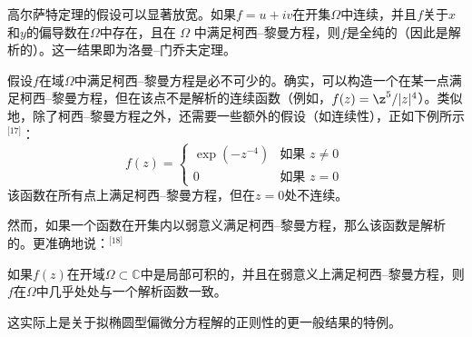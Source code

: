 高尔萨特定理的假设可以显著放宽。如果\( f = u + iv \)在开集\( \Omega \)中连续，并且\( f \)关于\( x \)和\( y \)的偏导数在\( \Omega \)中存在，且在 \( \Omega \) 中满足柯西–黎曼方程，则\( f \)是全纯的（因此是解析的）。这一结果即为洛曼–门乔夫定理。

假设\( f \)在域\( \Omega \)中满足柯西–黎曼方程是必不可少的。确实，可以构造一个在某一点满足柯西–黎曼方程，但在该点不是解析的连续函数（例如，\( f(z)=\z^5/|z|^4\)）。类似地，除了柯西–黎曼方程之外，还需要一些额外的假设（如连续性），正如下例所示\(^\text{[17]}\)：
\[
f(z) = 
\begin{cases} 
\exp(-z^{-4}) & \text{如果 } z \neq 0 \\
0 & \text{如果 } z = 0
\end{cases}~
\]
该函数在所有点上满足柯西–黎曼方程，但在\( z = 0 \)处不连续。

然而，如果一个函数在开集内以弱意义满足柯西–黎曼方程，那么该函数是解析的。更准确地说：\(^\text{[18]}\)

如果\( f(z) \)在开域\( \Omega \subset \mathbb{C} \)中是局部可积的，并且在弱意义上满足柯西–黎曼方程，则\( f \)在\( \Omega \)中几乎处处与一个解析函数一致。

这实际上是关于拟椭圆型偏微分方程解的正则性的更一般结果的特例。